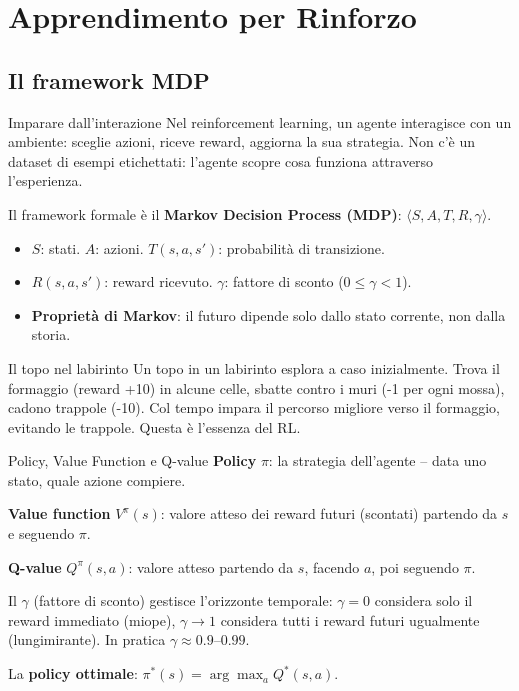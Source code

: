 \documentclass[12pt,a4paper]{article}
\begin{document}
\section{Apprendimento per Rinforzo}

\subsection{Il framework MDP}

\begin{narrativo}{Imparare dall'interazione}
Nel reinforcement learning, un agente interagisce con un ambiente: sceglie azioni, riceve reward, aggiorna la sua strategia. Non c'è un dataset di esempi etichettati: l'agente scopre cosa funziona attraverso l'esperienza.

Il framework formale è il \textbf{Markov Decision Process (MDP)}: $\langle S, A, T, R, \gamma \rangle$.
\begin{itemize}[noitemsep]
  \item $S$: stati. $A$: azioni. $T(s, a, s')$: probabilità di transizione.
  \item $R(s, a, s')$: reward ricevuto. $\gamma$: fattore di sconto ($0 \leq \gamma < 1$).
  \item \textbf{Proprietà di Markov}: il futuro dipende solo dallo stato corrente, non dalla storia.
\end{itemize}
\end{narrativo}

\begin{analogia}{Il topo nel labirinto}
Un topo in un labirinto esplora a caso inizialmente. Trova il formaggio (reward +10) in alcune celle, sbatte contro i muri (-1 per ogni mossa), cadono trappole (-10). Col tempo impara il percorso migliore verso il formaggio, evitando le trappole. Questa è l'essenza del RL.
\end{analogia}

\begin{narrativo}{Policy{,} Value Function e Q-value}
\textbf{Policy} $\pi$: la strategia dell'agente -- data uno stato, quale azione compiere.

\textbf{Value function} $V^\pi(s)$: valore atteso dei reward futuri (scontati) partendo da $s$ e seguendo $\pi$.

\textbf{Q-value} $Q^\pi(s,a)$: valore atteso partendo da $s$, facendo $a$, poi seguendo $\pi$.

Il $\gamma$ (fattore di sconto) gestisce l'orizzonte temporale: $\gamma = 0$ considera solo il reward immediato (miope), $\gamma \to 1$ considera tutti i reward futuri ugualmente (lungimirante). In pratica $\gamma \approx 0.9$--$0.99$.

La \textbf{policy ottimale}: $\pi^*(s) = \arg\max_a Q^*(s,a)$.
\end{narrativo}
\end{document}
